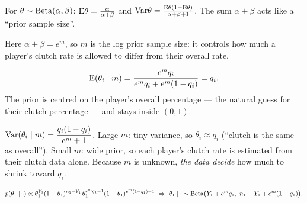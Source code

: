 \documentclass[11pt]{article}
\begin{document}
\begin{recall}
For $\theta\sim\mathrm{Beta}(\alpha,\beta)$: $\mathrm{E}\theta=\frac{\alpha}{\alpha+\beta}$ and $\mathrm{Var}\theta=\frac{\mathrm{E}\theta(1-\mathrm{E}\theta)}{\alpha+\beta+1}$. The sum $\alpha+\beta$ acts like a ``prior sample size''.
\end{recall}

\begin{keyidea}
Here $\alpha+\beta=e^m$, so $m$ is the log prior sample size: it controls how much a player's clutch rate is allowed to differ from their overall rate.
\end{keyidea}

\solution
{}
\[
\mathrm{E}(\theta_i\mid m)=\frac{e^mq_i}{e^mq_i+e^m(1-q_i)}=q_i.
\]
The prior is centred on the player's overall percentage --- the natural guess for their clutch percentage --- and stays inside $(0,1)$.

$\mathrm{Var}(\theta_i\mid m)=\dfrac{q_i(1-q_i)}{e^m+1}$. Large $m$: tiny variance, so $\theta_i\approx q_i$ (``clutch is the same as overall''). Small $m$: wide prior, so each player's clutch rate is estimated from their clutch data alone. Because $m$ is unknown, \emph{the data decide} how much to shrink toward $q_i$.

\[
p(\theta_1\mid\cdot)\propto\theta_1^{Y_1}(1-\theta_1)^{n_1-Y_1}\,\theta_1^{e^mq_1-1}(1-\theta_1)^{e^m(1-q_1)-1}
\ \Rightarrow\ \theta_1\mid\cdot\sim\dist{Beta}\big(Y_1+e^mq_1,\ n_1-Y_1+e^m(1-q_1)\big).
\]
\end{document}
